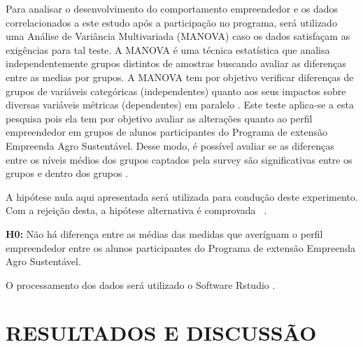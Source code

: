 Para analisar o desenvolvimento do comportamento empreendedor e os dados correlacionados a este estudo após a participação no programa, será utilizado uma Análise de Variância Multivariada (MANOVA) caso os dados satisfaçam as exigências para tal teste. A MANOVA é uma técnica estatística que analisa independentemente grupos distintos de amostras buscando avaliar as diferenças entre as medias por grupos. A MANOVA tem por objetivo verificar diferenças de grupos de variáveis categóricas (independentes) quanto aos seus impactos sobre diversas variáveis métricas (dependentes) em paralelo  \cite{hair_alise_2009}. 
Este teste aplica-se a esta pesquisa pois ela tem por objetivo avaliar as alterações quanto ao perfil empreendedor em grupos de alunos participantes do Programa de extensão Empreenda Agro Sustentável. Desse modo, é possível avaliar se as diferenças entre os níveis médios dos grupos captados pela \textit{}{survey} são significativas entre os grupos e dentro dos grupos \cite{rocha_avaliacao_2014}. 

A hipótese nula aqui apresentada será utilizada para condução deste experimento. Com a rejeição desta, a hipótese alternativa é comprovada \ \cite{hair_alise_2009}.

\textbf{H0:} Não há diferença entre as médias das medidas que averíguam o perfil empreendedor entre os alunos participantes do Programa de extensão Empreenda Agro Sustentável.

 O processamento dos dados será utilizado o Software Rstudio \cite{rstudio_team_rstudio:_2015}. 


\chapter{RESULTADOS E DISCUSSÃO }
